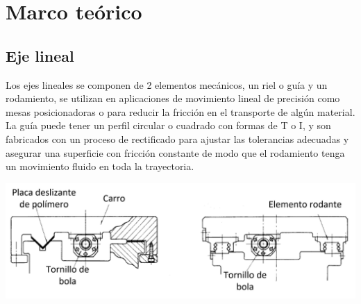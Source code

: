 \section{Marco teórico}

\subsection{Eje lineal}
Los ejes lineales se componen de 2 elementos mecánicos, un riel o guía y un rodamiento, se utilizan en aplicaciones de movimiento lineal de precisión como mesas posicionadoras o para reducir la fricción en el transporte de algún material. La guía puede tener un perfil circular o cuadrado con formas de T o I, y son fabricados con un proceso de rectificado para ajustar las tolerancias adecuadas y asegurar una superficie con fricción constante de modo que el rodamiento tenga un movimiento fluido en toda la trayectoria.\\
\begin{center}
    \includegraphics[scale=0.55]{imagenes/rodamientos.png}
    \label{fig:rodamientos}
\end{center}
